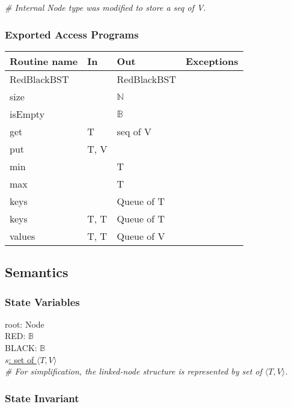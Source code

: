 \documentclass[12pt]{article}
\begin{document}
\noindent \textit{\# Internal Node type was modified to store a seq of V.}

\subsubsection* {Exported Access Programs}

\begin{tabular}{| l | l | l | l |}
\hline
\textbf{Routine name} & \textbf{In} & \textbf{Out} & \textbf{Exceptions}\\
\hline
RedBlackBST & ~ & RedBlackBST & \\
\hline
size & ~ & $\mathbb{N}$ & ~\\
\hline
isEmpty & ~ & $\mathbb{B}$ & ~\\
\hline
get & T & seq of V & ~\\
\hline
put & T, V & ~ & ~\\
\hline
min & ~ & T & ~\\
\hline
max & ~ & T & ~\\
\hline
keys & ~ & Queue of T & ~\\
\hline
keys &  T, T & Queue of T & ~\\
\hline
values & T, T & Queue of V & ~\\
\hline
\end{tabular}

\subsection* {Semantics}

\subsubsection* {State Variables}

root: Node\\
RED: $\mathbb{B}$\\
BLACK: $\mathbb{B}$\\
\underline{$s$: set of $\langle T, V \rangle$}\\

\noindent \textit{\# For simplification, the linked-node structure is represented by set of $\langle T, V \rangle$.}\\

\subsubsection* {State Invariant}
\end{document}
